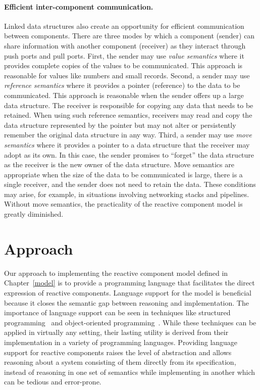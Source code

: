 \paragraph{Efficient inter-component communication.}
Linked data structures also create an opportunity for efficient communication between components.
There are three modes by which a component (sender) can share information with another component (receiver) as they interact through push ports and pull ports.
First, the sender may use \emph{value semantics} where it provides complete copies of the values to be communicated.
This approach is reasonable for values like numbers and small records.
Second, a sender may use \emph{reference semantics} where it provides a pointer (reference) to the data to be communicated.
This approach is reasonable when the sender offers up a large data structure.
The receiver is responsible for copying any data that needs to be retained.
When using such reference semantics, receivers may read and copy the data structure represented by the pointer but may not alter or persistently remember the original data structure in any way.
Third, a sender may use \emph{move semantics} where it provides a pointer to a data structure that the receiver may adopt as its own.
In this case, the sender promises to ``forget'' the data structure as the receiver is the new owner of the data structure.
Move semantics are appropriate when the size of the data to be communicated is large, there is a single receiver, and the sender does not need to retain the data.
These conditions may arise, for example, in situations involving networking stacks and pipelines.
Without move semantics, the practicality of the reactive component model is greatly diminished.

\section{Approach}

Our approach to implementing the reactive component model defined in Chapter~\ref{model} is to provide a programming language that facilitates the direct expression of reactive components.
Language support for the model is beneficial because it closes the semantic gap between reasoning and implementation.
The importance of language support can be seen in techniques like structured programming~\cite{dahl1972structured} and object-oriented programming~\cite{booch1982object}.
While these techniques can be applied in virtually any setting, their lasting utility is derived from their implementation in a variety of programming languages.
Providing language support for reactive components raises the level of abstraction and allows reasoning about a system consisting of them directly from its specification, instead of reasoning in one set of semantics while implementing in another which can be tedious and error-prone.

